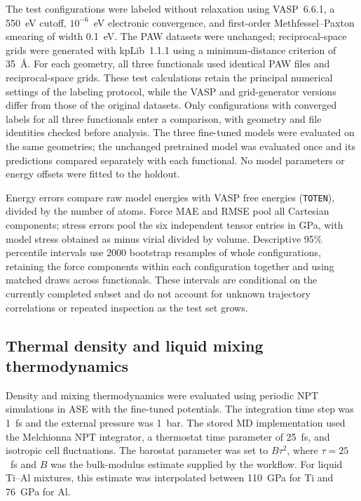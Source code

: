 The test configurations were labeled without relaxation using VASP~6.6.1, a 550~eV cutoff, $10^{-6}$~eV electronic convergence, and first-order Methfessel--Paxton smearing of width 0.1~eV.
The PAW datasets were unchanged; reciprocal-space grids were generated with kpLib~1.1.1 using a minimum-distance criterion of 35~\AA.
For each geometry, all three functionals used identical PAW files and reciprocal-space grids.
These test calculations retain the principal numerical settings of the labeling protocol, while the VASP and grid-generator versions differ from those of the original datasets.
Only configurations with converged labels for all three functionals enter a comparison, with geometry and file identities checked before analysis.
The three fine-tuned models were evaluated on the same geometries; the unchanged pretrained model was evaluated once and its predictions compared separately with each functional.
No model parameters or energy offsets were fitted to the holdout.

Energy errors compare raw model energies with VASP free energies (\texttt{TOTEN}), divided by the number of atoms.
Force MAE and RMSE pool all Cartesian components; stress errors pool the six independent tensor entries in GPa, with model stress obtained as minus virial divided by volume.
Descriptive 95\% percentile intervals use 2000 bootstrap resamples of whole configurations, retaining the force components within each configuration together and using matched draws across functionals.
These intervals are conditional on the currently completed subset and do not account for unknown trajectory correlations or repeated inspection as the test set grows.

\subsection{Thermal density and liquid mixing thermodynamics}
\label{sec:thermodynamics}

Density and mixing thermodynamics were evaluated using periodic NPT simulations in ASE with the fine-tuned potentials.
The integration time step was 1~fs and the external pressure was 1~bar.
The stored MD implementation used the Melchionna NPT integrator, a thermostat time parameter of 25~fs, and isotropic cell fluctuations.
The barostat parameter was set to $B\tau^2$, where $\tau=25$~fs and $B$ was the bulk-modulus estimate supplied by the workflow.
For liquid Ti--Al mixtures, this estimate was interpolated between 110~GPa for Ti and 76~GPa for Al.

